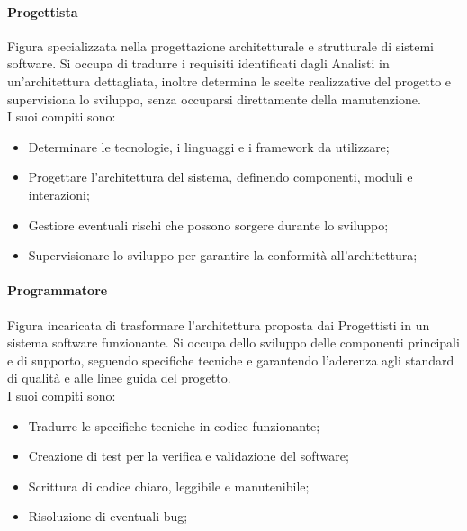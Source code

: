 \documentclass[10pt]{article}
\begin{document}
\begin{justify}
        \paragraph{Progettista}
        Figura specializzata nella progettazione architetturale e strutturale di sistemi software. Si occupa di tradurre i requisiti identificati dagli Analisti in un'architettura dettagliata, inoltre determina le scelte realizzative del progetto e supervisiona lo sviluppo, senza occuparsi direttamente della manutenzione.\\
        I suoi compiti sono:
        \begin{itemize}
            \item Determinare le tecnologie, i linguaggi e i framework da utilizzare;
            \item Progettare l'architettura del sistema, definendo componenti, moduli e interazioni;
            \item Gestiore eventuali rischi che possono sorgere durante lo sviluppo;
            \item Supervisionare lo sviluppo per garantire la conformità all'architettura;
        \end{itemize}
        
        \paragraph{Programmatore}
        Figura incaricata di trasformare l’architettura proposta dai Progettisti in un sistema software funzionante. Si occupa dello sviluppo delle componenti principali e di supporto, seguendo specifiche tecniche e garantendo l’aderenza agli standard di qualità e alle linee guida del progetto.\\
        I suoi compiti sono:
        \begin{itemize}
            \item Tradurre le specifiche tecniche in codice funzionante;
            \item Creazione di test per la verifica e validazione del software;
            \item Scrittura di codice chiaro, leggibile e manutenibile;
            \item Risoluzione di eventuali bug;
        \end{itemize}


\end{justify}
\end{document}

